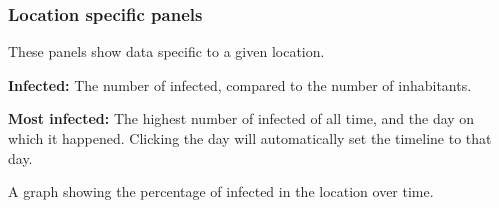 \subsubsection{Location specific panels}
These panels show data specific to a given location.
\begin{compactitem}	
	\item \textbf{Infected:} The number of infected, compared to the number of inhabitants.
	\item \textbf{Most infected:} The highest number of infected of all time, and the day on which it happened. Clicking the day will automatically set the timeline to that day.
	\item A graph showing the percentage of infected in the location over time.
\end{compactitem}